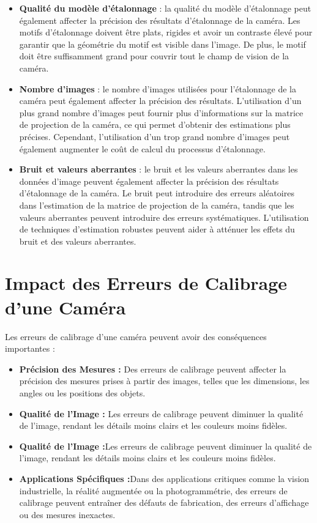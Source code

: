 \begin{itemize}
	\item \textbf{Qualité du modèle d’étalonnage} : la qualité du modèle d’étalonnage peut également affecter la précision des résultats d’étalonnage de la caméra. Les motifs d’étalonnage doivent être plats, rigides et avoir un contraste élevé pour garantir que la géométrie du motif est visible dans l’image. De plus, le motif doit être suffisamment grand pour couvrir tout le champ de vision de la caméra.\\
	
	\item \textbf{Nombre d'images} :  le nombre d’images utilisées pour l’étalonnage de la caméra peut également affecter la précision des résultats. L’utilisation d’un plus grand nombre d’images peut fournir plus d’informations sur la matrice de projection de la caméra, ce qui permet d’obtenir des estimations plus précises. Cependant, l’utilisation d’un trop grand nombre d’images peut également augmenter le coût de calcul du processus d’étalonnage. \\
	
	\item \textbf{Bruit et valeurs aberrantes} :  le bruit et les valeurs aberrantes dans les données d’image peuvent également affecter la précision des résultats d’étalonnage de la caméra. Le bruit peut introduire des erreurs aléatoires dans l’estimation de la matrice de projection de la caméra, tandis que les valeurs aberrantes peuvent introduire des erreurs systématiques. L’utilisation de techniques d’estimation robustes peuvent aider à atténuer les effets du bruit et des valeurs aberrantes.
\end{itemize}

\section{Impact des Erreurs de Calibrage d'une Caméra} 

Les erreurs de calibrage d'une caméra peuvent avoir des conséquences importantes :

\begin{itemize}
	\item \textbf{Précision des Mesures :} Des erreurs de calibrage peuvent affecter la précision des mesures prises à partir des images, telles que les dimensions, les angles ou les positions des objets.
	
	\item \textbf{Qualité de l'Image :} Les erreurs de calibrage peuvent diminuer la qualité de l'image, rendant les détails moins clairs et les couleurs moins fidèles.
	
	\item \textbf{Qualité de l'Image :}Les erreurs de calibrage peuvent diminuer la qualité de l'image, rendant les détails moins clairs et les couleurs moins fidèles.
	
	\item \textbf{Applications Spécifiques :}Dans des applications critiques comme la vision industrielle, la réalité augmentée ou la photogrammétrie, des erreurs de calibrage peuvent entraîner des défauts de fabrication, des erreurs d'affichage ou des mesures inexactes.
\end{itemize}

